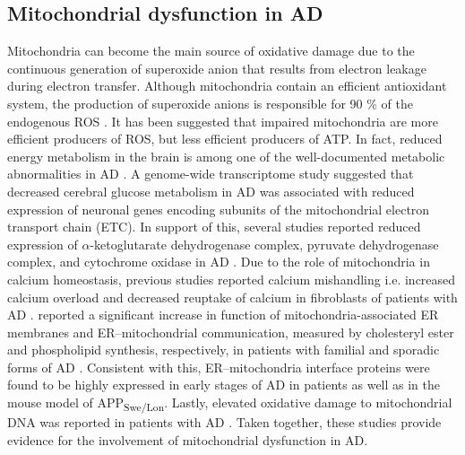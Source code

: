\subsection{Mitochondrial dysfunction in AD}
Mitochondria can become the main source of oxidative damage due to the continuous generation of superoxide anion that results from electron leakage during electron transfer. Although mitochondria contain an efficient antioxidant system, the production of superoxide anions is responsible for 90 \% of the endogenous ROS \citep{Wang2014}. It has been suggested that impaired mitochondria are more efficient producers of ROS, but less efficient producers of ATP. In fact, reduced energy metabolism in the brain is among one of the well-documented metabolic abnormalities in AD \citep{Wang2014}. A genome-wide transcriptome study suggested that decreased cerebral glucose metabolism in AD was associated with reduced expression of neuronal genes encoding subunits of the mitochondrial electron transport chain (ETC). In support of this, several studies reported reduced expression of $\alpha$-ketoglutarate dehydrogenase complex, pyruvate dehydrogenase complex, and cytochrome oxidase in AD \citep{Chandrasekaran1994,Cottrell2001,Maurer2000}. Due to the role of mitochondria in calcium homeostasis, previous studies reported calcium mishandling i.e. increased calcium overload and decreased reuptake of calcium in fibroblasts of patients with AD \citep{Ito1994,Peterson1985}. \citet{Area-Gomez2012} reported a significant increase in function of mitochondria-associated ER membranes and ER–mitochondrial communication, measured by cholesteryl ester and phospholipid synthesis, respectively, in patients with familial and sporadic forms of AD \citep{Area-Gomez2012}. Consistent with this, ER–mitochondria interface proteins were found to be highly expressed in early stages of AD in patients as well as in the mouse model of APP\textsubscript{Swe/Lon}. Lastly, elevated oxidative damage to mitochondrial DNA was reported in patients with AD \citep{Mecocci1994,Wang2005}. Taken together, these studies provide evidence for the involvement of mitochondrial dysfunction in AD.

